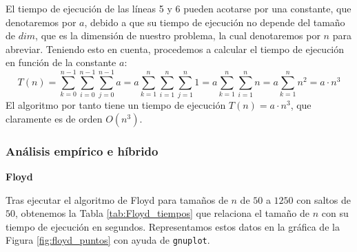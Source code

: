 \documentclass[12pt]{article}
\begin{document}
    
    El tiempo de ejecución de las líneas 5 y 6 pueden acotarse por una constante, que denotaremos por $a$, debido a que su tiempo de ejecución no depende del tamaño de $dim$, que es la dimensión de nuestro problema, la cual denotaremos por $n$ para abreviar. Teniendo esto en cuenta, procedemos a calcular el tiempo de ejecución en función de la constante $a$:
    $$T(n)=\sum_{k=0}^{n-1} \sum_{i=0}^{n-1} \sum_{j=0}^{n-1} a = a \sum_{k=1}^n \sum_{i=1}^n \sum_{j=1}^n 1 = a\sum_{k=1}^n \sum_{i=1}^n n =a \sum_{k=1}^n n^2 = a \cdot n^3$$
    El algoritmo por tanto tiene un tiempo de ejecución $T(n) = a\cdot n^3$, que claramente es de orden $O(n^3)$.
    \subsubsection{Análisis empírico e híbrido}
    \textbf{Floyd}

    Tras ejecutar el algoritmo de Floyd para tamaños de $n$ de $50$ a $1250$ con saltos de $50$, obtenemos la Tabla \ref{tab:Floyd_tiempos} que relaciona el tamaño de $n$ con su tiempo de ejecución en segundos. Representamos estos datos en la gráfica de la Figura \ref{fig:floyd_puntos} con ayuda de \verb|gnuplot|.
\end{document}
